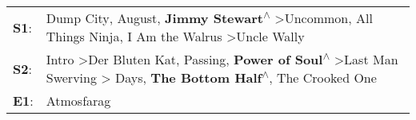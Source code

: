 \begin{supertabular}{p{0.03\textwidth}p{0.92\textwidth}}
 \textbf{S1}:  &                                                                           Dump City\textsuperscript{}, \enspace August\textsuperscript{}, \enspace \textbf{Jimmy Stewart\textsuperscript{$\wedge$}} \textgreater \enspace Uncommon\textsuperscript{}, \enspace All Things Ninja\textsuperscript{}, \enspace I Am the Walrus\textsuperscript{} \textgreater \enspace Uncle Wally\textsuperscript{}  \enspace  \\
 \textbf{S2}:  &  Intro\textsuperscript{} \textgreater \enspace Der Bluten Kat\textsuperscript{}, \enspace Passing\textsuperscript{}, \enspace \textbf{Power of Soul\textsuperscript{$\wedge$}} \textgreater \enspace Last Man Swerving\textsuperscript{} \textgreater {} Days\textsuperscript{}, \enspace \textbf{The Bottom Half\textsuperscript{$\wedge$}}, \enspace The Crooked One\textsuperscript{}  \enspace  \\
 \textbf{E1}:  &                                                                                                                                                                                                                                                                                                                                                                      Atmosfarag\textsuperscript{}  \enspace  \\
\end{supertabular}
